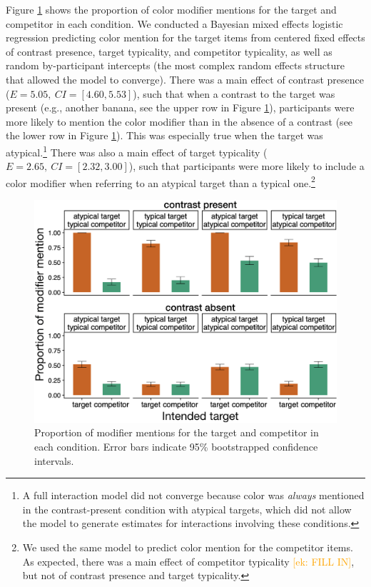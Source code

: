 \documentclass[10pt,letterpaper]{article}
\newcommand{\ek}[1]{\textcolor{Orange}{[ek: #1]}}
\newcommand{\figref}[1]{Figure \ref{#1}}
\begin{document}
\figref{prod-results} shows the proportion of color modifier mentions for the target and competitor in each condition. We conducted a Bayesian mixed effects logistic regression predicting color mention for the target items from centered fixed effects of contrast presence, target typicality, and competitor typicality, as well as random by-participant intercepts (the most complex random effects structure that allowed the model to converge).%
There was a main effect of contrast presence ($E=5.05,\ CI=[4.60,5.53]$), such that when a contrast to the target was present (e.g., another banana, see the upper row in \figref{prod-results}), participants were more likely to mention the color modifier than in the absence of a contrast (see the lower row in \figref{prod-results}). This was especially true when the target was atypical.\footnote{A full interaction model did not converge because color was \emph{always} mentioned in the contrast-present condition with atypical targets, which did not allow the model to generate estimates for interactions involving these conditions.} There was also a main effect of target typicality ($E=2.65,\ CI=[2.32,3.00]$), such that participants were more likely to include a color modifier when referring to an atypical target than a typical one.\footnote{We used the same model to predict color mention for the competitor items. As expected, there was a main effect of competitor typicality \ek{FILL IN}, but not of contrast presence and target typicality.}

\begin{figure}
	\begin{center}
		\includegraphics[width=.475\textwidth]{graphs/prod-bycond-paper.pdf}
	\end{center}
\caption{Proportion of modifier mentions for the target and competitor in each condition. Error bars indicate 95\% bootstrapped confidence intervals.} 
\label{prod-results}
\end{figure}
\end{document}
